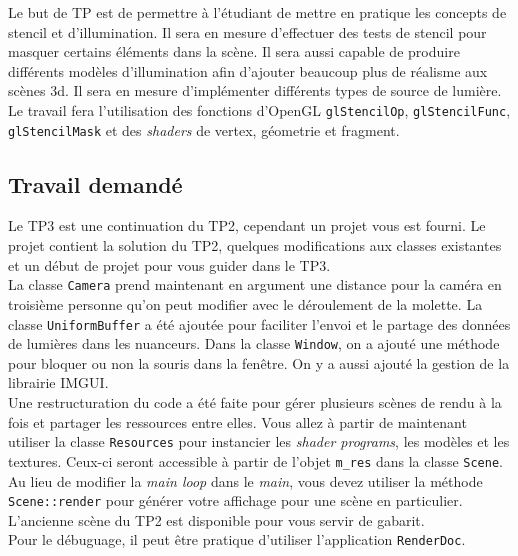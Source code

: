 \documentclass{article}[letterpaper, 11pt]
\begin{document}
Le but de TP est de permettre à l'étudiant de mettre en pratique les concepts de stencil et d'illumination. Il sera en mesure d'effectuer des tests de stencil pour masquer certains éléments dans la scène. Il sera aussi capable de produire différents modèles d'illumination afin d'ajouter beaucoup plus de réalisme aux scènes 3d. Il sera en mesure d'implémenter différents types de source de lumière.
\\
Le travail fera l'utilisation des fonctions d'OpenGL \texttt{glStencilOp}, \texttt{glStencilFunc}, \texttt{glStencilMask} et
des \textit{shaders} de vertex, géometrie et fragment.

\subsection{Travail demandé}

Le TP3 est une continuation du TP2, cependant un projet vous est fourni. Le projet contient la solution du TP2, quelques modifications aux classes existantes et un début de projet pour vous guider dans le TP3.\vspace*{11pt}
\\
La classe \texttt{Camera} prend maintenant en argument une distance pour la caméra en troisième personne qu'on peut modifier avec le déroulement de la molette.
La classe \texttt{UniformBuffer} a été ajoutée pour faciliter l'envoi et le partage des données de lumières dans les nuanceurs.
Dans la classe \texttt{Window}, on a ajouté une méthode pour bloquer ou non la souris dans la fenêtre.
On y a aussi ajouté la gestion de la librairie IMGUI.\vspace*{11pt}
\\
Une restructuration du code a été faite pour gérer plusieurs scènes de rendu à la fois et partager les ressources entre elles.
Vous allez à partir de maintenant utiliser la classe \texttt{Resources} pour instancier les \textit{shader programs}, les modèles et les textures.
Ceux-ci seront accessible à partir de l'objet \texttt{m\_res} dans la classe \texttt{Scene}.
Au lieu de modifier la \textit{main loop} dans le \textit{main}, vous devez utiliser la méthode \texttt{Scene::render} pour générer votre affichage pour une scène en particulier.
L'ancienne scène du TP2 est disponible pour vous servir de gabarit.\vspace*{11pt}
\\
Pour le débuguage, il peut être pratique d'utiliser l'application \texttt{RenderDoc}.
\end{document}
